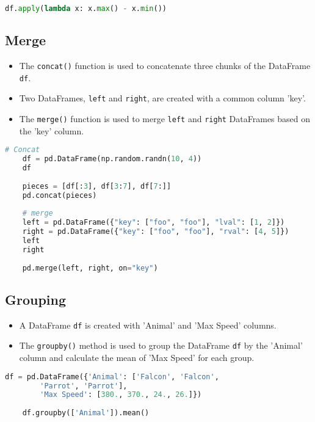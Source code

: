 \begin{lstlisting}[language=Python]
	df.apply(lambda x: x.max() - x.min())
\end{lstlisting}




\subsection{Merge}
\begin{itemize}
	\item The \texttt{concat()} function is used to concatenate three chunks of the DataFrame \texttt{df}.
	\item Two DataFrames, \texttt{left} and \texttt{right}, are created with a common column 'key'.
	\item The \texttt{merge()} function is used to merge \texttt{left} and \texttt{right} DataFrames based on the 'key' column.
\end{itemize}


\begin{lstlisting}[language=Python]
	# Concat
	df = pd.DataFrame(np.random.randn(10, 4))
	df
	
	pieces = [df[:3], df[3:7], df[7:]]
	pd.concat(pieces)
	
	# merge
	left = pd.DataFrame({"key": ["foo", "foo"], "lval": [1, 2]})
	right = pd.DataFrame({"key": ["foo", "foo"], "rval": [4, 5]})
	left
	right
	
	pd.merge(left, right, on="key")
\end{lstlisting}


\subsection{Grouping}
\begin{itemize}
	\item A DataFrame \texttt{df} is created with 'Animal' and 'Max Speed' columns.
	\item The \texttt{groupby()} method is used to group the DataFrame \texttt{df} by the 'Animal' column and calculate the mean of 'Max Speed' for each group.
\end{itemize}


\begin{lstlisting}[language=Python]
	df = pd.DataFrame({'Animal': ['Falcon', 'Falcon',
		'Parrot', 'Parrot'],
		'Max Speed': [380., 370., 24., 26.]})
	
	df.groupby(['Animal']).mean()
\end{lstlisting}




